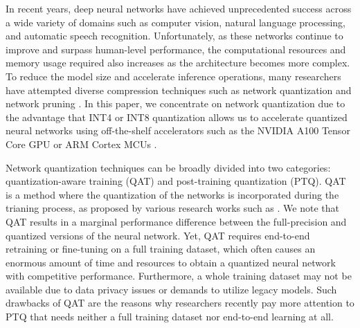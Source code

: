 \documentclass{article}
\theoremstyle{plain}
\theoremstyle{definition}
\theoremstyle{remark}
\begin{document}
In recent years, deep neural networks have achieved unprecedented success across a wide variety of domains such as computer vision, natural language processing, and automatic speech recognition.
Unfortunately, as these networks continue to improve and surpass human-level performance, the computational resources and memory usage required also increases as the architecture becomes more complex.
To reduce the model size and accelerate inference operations, many researchers have attempted diverse compression techniques such as network quantization \citep{courbariaux2016binarized} and network pruning \citep{han2016deep}. In this paper, we concentrate on network quantization due to the advantage that INT4 or INT8 quantization allows us to accelerate quantized neural networks using off-the-shelf accelerators such as the NVIDIA A100 Tensor Core GPU \citep{wu2020integer} or ARM Cortex MCUs \citep{kim2021performance}.

Network quantization techniques can be broadly divided into two categories: quantization-aware training (QAT) and post-training quantization (PTQ). QAT is a method where the quantization of the networks is incorporated during the trianing process, as proposed by various research works such as \citet{jung2019learning, jain2019tqt, zhao2020linear, esser2020learned, lee2021cluster}. We note that QAT results in a marginal performance difference between the full-precision and quantized versions of the neural network. Yet, QAT requires end-to-end retraining or fine-tuning on a full training dataset, which often causes an enormous amount of time and resources to obtain a quantized neural network with competitive performance. Furthermore, a whole training dataset may not be available due to data privacy issues or demands to utilize legacy models. Such drawbacks of QAT are the reasons why researchers recently pay more attention to PTQ \citep{zhao2019improving, wang2020towards, nahshan2021loss} that needs neither a full training dataset nor end-to-end learning at all. 
\end{document}
